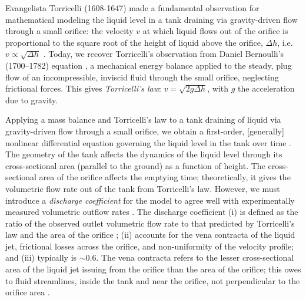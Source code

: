 \documentclass[openacc]{rsproca_new}%
\begin{document}

Evangelista Torricelli (1608-1647) made a fundamental observation for mathematical modeling the liquid level in a tank draining via gravity-driven flow through a small orifice: the velocity $v$ at which liquid flows out of the orifice is proportional to the square root of the height of liquid above the orifice, $\Delta h$, i.e. $v\propto \sqrt{\Delta h}$ \cite{mills1982newton}.
Today, we recover Torricelli's observation from Daniel Bernoulli's (1700–1782) equation \cite{welty2020fundamentals}, a mechanical energy balance applied to the steady, plug flow of an incompressible, inviscid fluid through the small orifice, neglecting frictional forces. This gives \emph{Torricelli's law}: $v=\sqrt{2 g \Delta h}$, with $g$ the acceleration due to gravity. \cite{d2021torricelli,teoman2022discharge}

Applying a mass balance and Torricelli's law to a tank draining of liquid via gravity-driven flow through a small orifice, we obtain a first-order, [generally] nonlinear differential equation governing the liquid level in the tank over time \cite{groetsch1993inverse,seborg2016process,debook}.
The geometry of the tank affects the dynamics of the liquid level through its cross-sectional area (parallel to the ground) as a function of height.
The cross-sectional area of the orifice affects the emptying time; theoretically, it gives the volumetric flow rate out of the tank from Torricelli's law. 
However, we must introduce a \emph{discharge coefficient} \cite{de2000pin,blasone2015discharge,wadhwa2021study,liu2008drainage} for the model to agree well with experimentally measured volumetric outflow rates \cite{farmer1992physical,driver1998torricelli,brady2009siphons,rother2024modelling,paldy1963apparatus,ivanov2014testing,williams2021vessel,pavesi2019investigating,planinvsivc2011holes,saleta2005experimental,lopac2015water,powell2012carrying}.
The discharge coefficient
(i) is defined as the ratio of the observed outlet volumetric flow rate to that predicted by Torricelli's law and the area of the orifice \cite{hicks2014determining};
(ii) accounts for the vena contracta of the liquid jet, frictional losses across the orifice, and non-uniformity of the velocity profile; and
(iii) typically is $\sim$0.6.
The vena contracta refers to the lesser cross-sectional area of the liquid jet issuing from the orifice than the area of the orifice; this owes to fluid streamlines, inside the tank and near the orifice, not perpendicular to the orifice area \cite{horsch2020simple}. 
\cite{teoman2022discharge,hicks2014determining,blasone2015discharge,lienhard1984velocity,wadhwa2021study}
\end{document}
